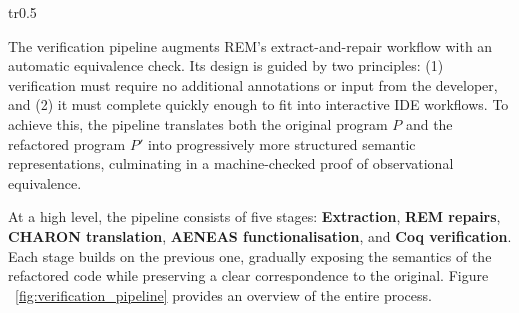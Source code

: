 \begin{wrapfigure}{tr}{0.5\textwidth} %
  \centering
  \vspace{\baselineskip}
  \vspace{\baselineskip}
  \vspace{\baselineskip}

  \caption{Overview of the verification pipeline: from source code extraction to proof of observational equivalence in Coq.}
  \label{fig:verification_pipeline}
\end{wrapfigure}

The verification pipeline augments REM's extract-and-repair workflow with an
automatic equivalence check. Its design is guided by two principles: (1)
verification must require no additional annotations or input from the developer,
and (2) it must complete quickly enough to fit into interactive IDE workflows.
To achieve this, the pipeline translates both the original program $P$ and the
refactored program $P'$ into progressively more structured semantic
representations, culminating in a machine-checked proof of observational
equivalence.

At a high level, the pipeline consists of five stages: \textbf{Extraction},
\textbf{REM repairs}, \textbf{CHARON translation}, \textbf{AENEAS
functionalisation}, and \textbf{Coq verification}. Each stage builds on the
previous one, gradually exposing the semantics of the refactored code while
preserving a clear correspondence to the original. Figure
~\ref{fig:verification_pipeline} provides an overview of the entire process.

